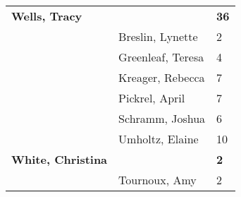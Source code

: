 \documentclass{article}\usepackage[]{graphicx}\usepackage[]{color}
\begin{document}
{\begin{longtable} { >{\raggedright}p{}|p{}p{}}
   \rowcolor[gray]{0.90}\textbf{Wells, Tracy} &  & \hspace{2cm}\textbf{36} \\ 
   \rowcolor[gray]{0.90} & Breslin, Lynette & 2 \\ 
   & Greenleaf, Teresa & 4 \\ 
   & Kreager, Rebecca & 7 \\ 
   & Pickrel, April & 7 \\ 
   \rowcolor[gray]{0.90} & Schramm, Joshua & 6 \\ 
   \rowcolor[gray]{0.90} & Umholtz, Elaine & 10 \\ 
   \rowcolor[gray]{0.90}\textbf{White, Christina} &  & \hspace{2cm}\textbf{2} \\ 
   & Tournoux, Amy & 2 \\ 
   \end{longtable}

}
\end{document}
